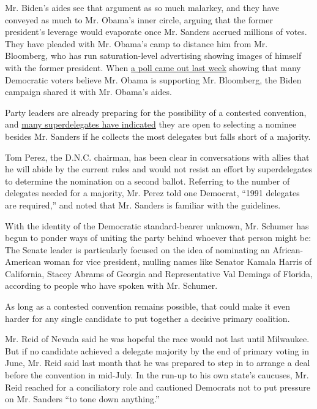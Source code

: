 Mr. Biden's aides see that argument as so much malarkey, and they have
conveyed as much to Mr. Obama's inner circle, arguing that the former
president's leverage would evaporate once Mr. Sanders accrued millions
of votes. They have pleaded with Mr. Obama's camp to distance him from
Mr. Bloomberg, who has run saturation-level advertising showing images
of himself with the former president. When
\href{https://morningconsult.com/2020/02/27/obama-endorsement-primary-poll/}{a
poll came out last week} showing that many Democratic voters believe Mr.
Obama is supporting Mr. Bloomberg, the Biden campaign shared it with Mr.
Obama's aides.

Party leaders are already preparing for the possibility of a contested
convention, and
\href{https://www.nytimes3xbfgragh.onion/2020/02/27/us/politics/democratic-superdelegates.html?searchResultPosition=2}{many
superdelegates have indicated} they are open to selecting a nominee
besides Mr. Sanders if he collects the most delegates but falls short of
a majority.

Tom Perez, the D.N.C. chairman, has been clear in conversations with
allies that he will abide by the current rules and would not resist an
effort by superdelegates to determine the nomination on a second ballot.
Referring to the number of delegates needed for a majority, Mr. Perez
told one Democrat, ``1991 delegates are required,'' and noted that Mr.
Sanders is familiar with the guidelines.

With the identity of the Democratic standard-bearer unknown, Mr. Schumer
has begun to ponder ways of uniting the party behind whoever that person
might be: The Senate leader is particularly focused on the idea of
nominating an African-American woman for vice president, mulling names
like Senator Kamala Harris of California, Stacey Abrams of Georgia and
Representative Val Demings of Florida, according to people who have
spoken with Mr. Schumer.

As long as a contested convention remains possible, that could make it
even harder for any single candidate to put together a decisive primary
coalition.

Mr. Reid of Nevada said he was hopeful the race would not last until
Milwaukee. But if no candidate achieved a delegate majority by the end
of primary voting in June, Mr. Reid said last month that he was prepared
to step in to arrange a deal before the convention in mid-July. In the
run-up to his own state's caucuses, Mr. Reid reached for a conciliatory
role and cautioned Democrats not to put pressure on Mr. Sanders ``to
tone down anything.''

